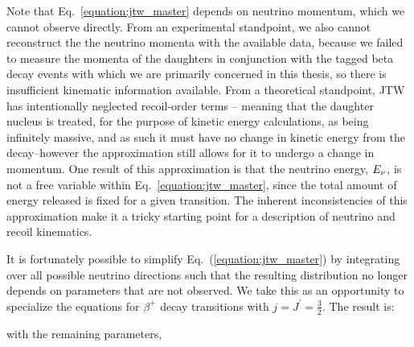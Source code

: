Note that Eq.~\ref{equation:jtw_master} depends on neutrino momentum, which we cannot observe directly.  
From an experimental standpoint, we also cannot reconstruct the the neutrino momenta with the available data, because we failed to measure the momenta of the daughters in conjunction with the tagged beta decay events with which we are primarily concerned in this thesis, so there is insufficient kinematic information available.   From a theoretical standpoint, JTW has intentionally neglected recoil-order terms -- meaning that the daughter nucleus is treated, for the purpose of kinetic energy calculations, as being infinitely massive, and as such it must have no change in kinetic energy from the decay--however the approximation still allows for it to undergo a change in momentum.  One result of this approximation is that the neutrino energy, $E_{\nu}$, is not a free variable within Eq.~\ref{equation:jtw_master}, since the total amount of energy released is fixed for a given transition.  The inherent inconsistencies of this approximation make it a tricky starting point for a description of neutrino and recoil kinematics.


It is fortunately possible to simplify Eq.~(\ref{equation:jtw_master}) by integrating over all possible neutrino directions %
such that the resulting distribution no longer depends on parameters that are not observed.  
%
We take this as an opportunity to specialize the equations for $\beta^+$ decay transitions with $j = J^\prime = \frac{3}{2}$. The result 
is:

\unskip with the remaining parameters,

